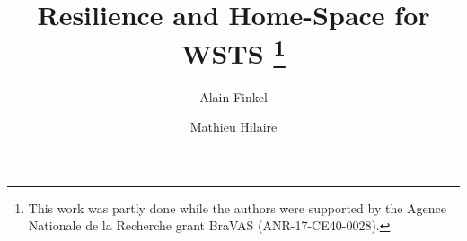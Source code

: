 \documentclass[runningheads]{llncs}
\begin{document}
%
\title{Resilience and Home-Space for WSTS \thanks{This work was partly done while the authors were supported by the Agence Nationale de la Recherche grant BraVAS (ANR-17-CE40-0028).}} 
%
%
\author{Alain Finkel \and Mathieu Hilaire}
%
%

%
\maketitle              %
%
\end{document}
